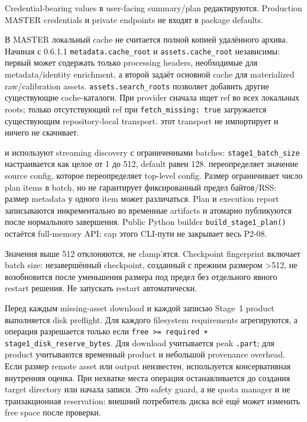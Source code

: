 Credential-bearing values в user-facing summary/plan редактируются. Production MASTER credentials и private endpoints не входят в package defaults.

В MASTER локальный cache не считается полной копией удалённого архива. Начиная с 0.6.1.1 \texttt{metadata.cache\_root} и \texttt{assets.cache\_root} независимы: первый может содержать только processing headers, необходимые для metadata/identity enrichment, а второй задаёт основной cache для materialized raw/calibration assets. \texttt{assets.search\_roots} позволяет добавить другие существующие cache-каталоги. При  provider сначала ищет ref во всех локальных roots; только отсутствующий ref при \texttt{fetch\_missing: true} загружается существующим repository-local transport.  этот transport не импортирует и ничего не скачивает.

 и  используют streaming discovery с ограниченными batches: \texttt{stage1\_batch\_size} настраивается как целое от 1 до 512, default равен 128.  переопределяет значение source config, которое переопределяет top-level config. Размер ограничивает число plan items в batch, но не гарантирует фиксированный предел байтов/RSS: размер metadata у одного item может различаться. Plan и execution report записываются инкрементально во временные artifacts и атомарно публикуются после нормального завершения. Public Python builder \texttt{build\_stage1\_plan()} остаётся full-memory API; cap этого CLI-пути не закрывает весь P2-08.

Значения выше 512 отклоняются, не clamp'ятся. Checkpoint fingerprint включает batch size: незавершённый checkpoint, созданный с прежним размером >512, не возобновится после уменьшения размера под предел без отдельного явного restart решения. Не запускать restart автоматически.

Перед каждым missing-asset download и каждой записью Stage~1 product выполняется disk preflight. Для каждого filesystem requirements агрегируются, а операция разрешается только если \texttt{free >= required + stage1\_disk\_reserve\_bytes}. Для download учитывается peak \texttt{.part}; для product учитываются временный product и небольшой provenance overhead. Если размер remote asset или output неизвестен, используется консервативная внутренняя оценка. При нехватке места операция останавливается до создания target directory или начала записи. Это safety guard, а не quota manager и не транзакционная reservation: внешний потребитель диска всё ещё может изменить free space после проверки.

